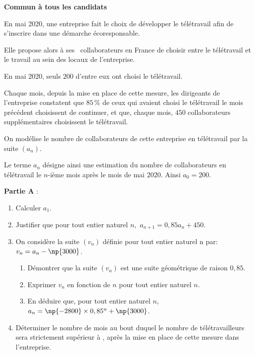 
\textbf{Commun à tous les candidats}

\medskip

En mai 2020, une entreprise fait le choix de développer le télétravail afin de s'inscrire dans une démarche écoresponsable.

Elle propose alors à ses ~collaborateurs en France de choisir entre le télétravail et le travail au sein des locaux de l'entreprise.

En mai 2020, seuls $200$ d'entre eux ont choisi le télétravail.

Chaque mois, depuis la mise en place de cette mesure, les dirigeants de l'entreprise constatent que $85$\,\% de ceux qui avaient choisi le télétravail le mois précédent choisissent de continuer, et que, chaque mois, $450$ collaborateurs supplémentaires choisissent le télétravail.

On modélise le nombre de collaborateurs de cette entreprise en télétravail par la suite $\left(a_n\right)$.

Le terme $a_n$ désigne ainsi une estimation du nombre de collaborateurs en télétravail le $n$-ième mois après le mois de mai 2020. Ainsi $a_0 = 200$.

\bigskip

\textbf{Partie A }:

\medskip

\begin{enumerate}
\item Calculer $a_1$.
\item Justifier que pour tout entier naturel $n$,\,
$a_{n+1} = 0,85a_n + 450$.
\item On considère la suite $\left(v_n\right)$ définie pour tout entier naturel n par: $v_n = a_n - \np{3000}$.
	\begin{enumerate}
		\item Démontrer que la suite $\left(v_n\right)$ est une suite géométrique de raison $0,85$. 
		\item Exprimer $v_n$ en fonction de $n$ pour tout entier naturel $n$.
		\item En déduire que, pour tout entier naturel $n$,\,
$a_n = \np{- 2800} \times  0,85^n + \np{3000}$.
	\end{enumerate}
\item Déterminer le nombre de mois au bout duquel le nombre de télétravailleurs sera strictement supérieur à , après la mise en place de cette mesure dans l'entreprise.
\end{enumerate}

